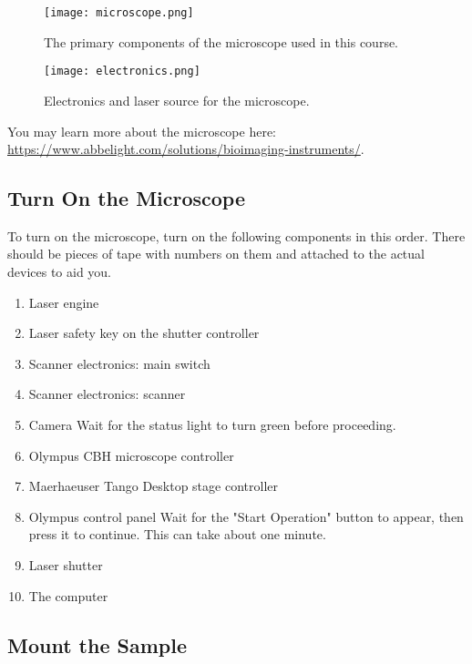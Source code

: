 \documentclass[10pt,a4paper,oneside]{book}
\begin{document}
\begin{figure}[ht]
    \centering
    \texttt{[image: microscope.png]}
    \caption{The primary components of the microscope used in this course.}
    \label{fig:microscope}
\end{figure}

\begin{figure}[ht]
    \centering
    \texttt{[image: electronics.png]}
    \caption{Electronics and laser source for the microscope.}
    \label{fig:electronics}
\end{figure}

You may learn more about the microscope here: \url{https://www.abbelight.com/solutions/bioimaging-instruments/}.

\subsection{Turn On the Microscope}\label{sec:startup}

To turn on the microscope, turn on the following components in this order. There should be pieces of tape with numbers on them and attached to the actual devices to aid you.

\begin{enumerate}
    \item Laser engine
    \item Laser safety key on the shutter controller
    \item Scanner electronics: main switch
    \item Scanner electronics: scanner
    \item Camera \newline Wait for the status light to turn green before proceeding.
    \item Olympus CBH microscope controller
    \item Maerhaeuser Tango Desktop stage controller
    \item Olympus control panel \newline Wait for the "Start Operation" button to appear, then press it to continue. This can take about one minute.
    \item Laser shutter
    \item The computer
\end{enumerate}

\subsection{Mount the Sample}\label{sec:mount-sample}
\end{document}
